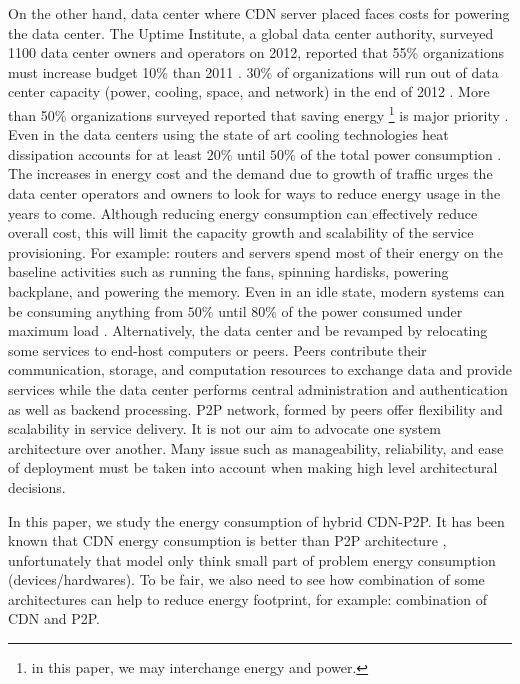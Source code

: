 \documentclass[conference]{IEEEtran}
\begin{document}
On the other hand, data center where CDN server placed faces costs for powering the data center.
The Uptime Institute, a global data center authority, surveyed 1100 data center owners and operators on 2012, reported that 55\% organizations must increase budget 10\% than 2011 \cite{uptime}.  
30\% of organizations will run out of data center capacity (power, cooling, space, and network) in the end of 2012 \cite{uptime}. 
More than 50\% organizations surveyed reported that saving energy \footnote{in this paper, we may interchange energy and power.} is major priority \cite{uptime}.
Even in the data centers using the state of art cooling technologies heat dissipation accounts for at least $20\%$ until $50\%$ of the total power consumption 
\cite{google}.
The increases in energy cost and the demand due to growth of traffic urges the data center operators and owners to look for ways to reduce energy usage in the years to come.
Although reducing energy consumption can effectively reduce overall cost, this will limit the capacity growth and scalability of the service provisioning.
For example: routers and servers spend most of their energy on the baseline activities such as running the fans, spinning hardisks, powering backplane, and powering the memory. 
Even in an idle state, modern systems can be consuming anything from $50\%$ until $80\%$ of the power consumed under maximum load \cite{4404806,4509688}.
Alternatively, the data center and be revamped by relocating some services to end-host computers or peers.
Peers contribute their communication, storage, and computation resources to exchange data and provide services while the data center performs central administration and authentication as well as backend processing.
P2P network, formed by peers offer flexibility and scalability in service delivery.
It is not our aim to advocate one system architecture over another.
Many issue such as manageability, reliability, and ease of deployment must be taken into account when making high level architectural decisions.

In this paper, we study the energy consumption of hybrid CDN-P2P.  
It has been known that CDN energy consumption is better than P2P architecture \cite{feldmann2010energy,baliga2007energy}, unfortunately that model only think small part of problem energy consumption (devices/hardwares).
To be fair, we also need to see how combination of some architectures can help to reduce energy footprint, for example: combination of CDN and P2P.
\end{document}
